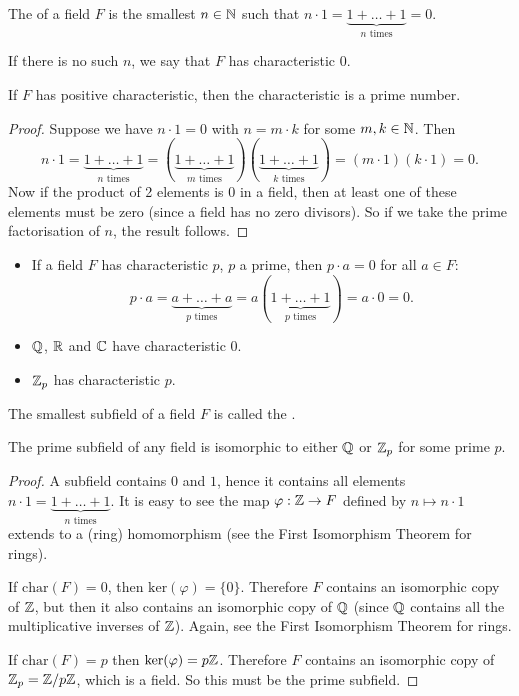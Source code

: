 \begin{definition}
	The  of a field $F$ is the  smallest $n \in \mathbb{N}$ such that $n \cdot 1 = \underbrace{1 + \ldots + 1}_{n \text{ times}} = 0$.
	
	If there is no such $n$, we say that $F$ has characteristic $0$.
\end{definition}

\begin{proposition}
	If $F$ has positive characteristic, then the characteristic is a prime number.
	\begin{proof}
		Suppose we have $n \cdot 1 = 0$ with $n = m \cdot k$ for some $m, k \in \mathbb{N}$. Then
		\[
			n \cdot 1 = \underbrace{1 + \ldots + 1}_{n \text{ times}} = (\underbrace{1 + \ldots + 1}_{m \text{ times}})(\underbrace{1 + \ldots + 1}_{k \text{ times}}) = (m \cdot 1)(k \cdot 1) = 0.
		\]
		Now if the product of 2 elements is $0$ in a field, then at least one of these elements must be zero (since a field has no zero divisors). So if we take the prime factorisation of $n$, the result follows.
	\end{proof}
\end{proposition}

\begin{remarks}\hfill
	\begin{itemize}
		\item If a field $F$ has characteristic $p$, $p$ a prime, then $p \cdot a = 0$ for all $a \in F$:
		\[
			p \cdot a = \underbrace{a + \ldots + a}_{p \text{ times}} = a(\underbrace{1 + \ldots + 1}_{p \text{ times}}) = a \cdot 0 = 0.
		\]
		\item $\mathbb{Q}$, $\mathbb{R}$ and $\mathbb{C}$ have characteristic $0$.
		\item $\mathbb{Z}_p$ has characteristic $p$.
	\end{itemize}
\end{remarks}

\begin{definition}
	The smallest subfield of a field $F$ is called the .
\end{definition}

\begin{proposition}
	The prime subfield of any field is isomorphic to either $\mathbb{Q}$ or $\mathbb{Z}_p$ for some prime $p$.
	\begin{proof}
		A subfield contains $0$ and $1$, hence it contains all elements $n \cdot 1 = \underbrace{1 + \ldots + 1}_{n \text{ times}}$. It is easy to see the map $\varphi : \mathbb{Z} \to F$ defined by $n \mapsto n \cdot 1$ extends to a (ring) homomorphism (see the First Isomorphism Theorem for rings).
		
		If $\text{char}(F) = 0$, then $\text{ker}(\varphi) = \{0\}$. Therefore $F$ contains an isomorphic copy of $\mathbb{Z}$, but then it also contains an isomorphic copy of $\mathbb{Q}$ (since $\mathbb{Q}$ contains all the multiplicative inverses of $\mathbb{Z}$). Again, see the First Isomorphism Theorem for rings.
		
		If $\text{char}(F) = p$ then $\text{ker}(\varphi) = p\mathbb{Z}$. Therefore $F$ contains an isomorphic copy of $\mathbb{Z}_p = \mathbb{Z} / p\mathbb{Z}$, which is  a field. So this must be the prime subfield.
	\end{proof}
\end{proposition}

